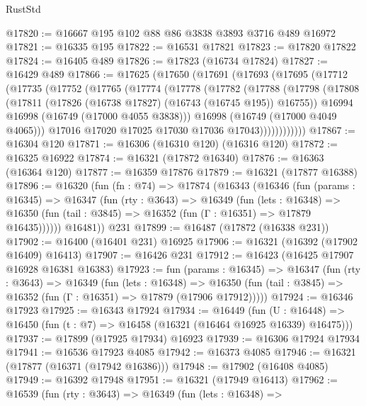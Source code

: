 \begin{lexlean}{RustStd}
\begin{coremodule}
@17820 := @16667 @195 @102 @88 @86 @3838 @3893 @3716 @489 @16972
@17821 := @16335 @195
@17822 := @16531 @17821
@17823 := @17820 @17822
@17824 := @16405 @489
@17826 := @17823 (@16734 @17824)
@17827 := @16429 @489
@17866 := @17625
    (@17650
      (@17691
        (@17693
          (@17695
            (@17712
              (@17735
                (@17752
                  (@17765
                    (@17774
                      (@17778
                        (@17782
                          (@17788
                            (@17798
                              (@17808
                                (@17811 (@17826 (@16738 @17827) (@16743 (@16745 @195)) @16755))
                                @16994
                                @16998
                                (@16749 (@17000 @4055 @3838)))
                              @16998
                              (@16749 (@17000 @4049 @4065)))
                            @17016
                            @17020
                            @17025
                            @17030
                            @17036
                            @17043))))))))))))
@17867 := @16304 @120
@17871 := @16306 (@16310 @120) (@16316 @120)
@17872 := @16325 @16922
@17874 := @16321 (@17872 @16340)
@17876 := @16363 (@16364 @120)
@17877 := @16359 @17876
@17879 := @16321 (@17877 @16388)
@17896 := @16320
    (fun (fn : @74) =>
    @17874
      (@16343
        (@16346
          (fun (params : @16345) =>
          @16347
            (fun (rty : @3643) =>
            @16349
              (fun (lets : @16348) =>
              @16350 (fun (tail : @3845) => @16352 (fun (Γ : @16351) => @17879 @16435))))))
        @16481))
    @231
@17899 := @16487 (@17872 (@16338 @231))
@17902 := @16400 (@16401 @231) @16925
@17906 := @16321 (@16392 (@17902 @16409) @16413)
@17907 := @16426 @231
@17912 := @16423 (@16425 @17907 @16928 @16381 @16383)
@17923 := fun (params : @16345) =>
  @16347
    (fun (rty : @3643) =>
    @16349
      (fun (lets : @16348) =>
      @16350 (fun (tail : @3845) => @16352 (fun (Γ : @16351) => @17879 (@17906 @17912)))))
@17924 := @16346 @17923
@17925 := @16343 @17924
@17934 := @16449
    (fun (U : @16448) => @16450 (fun (t : @7) => @16458 (@16321 (@16464 @16925 @16339) @16475)))
@17937 := @17899 (@17925 @17934) @16923
@17939 := @16306 @17924 @17934
@17941 := @16536 @17923 @4085
@17942 := @16373 @4085
@17946 := @16321 (@17877 (@16371 (@17942 @16386)))
@17948 := @17902 (@16408 @4085)
@17949 := @16392 @17948
@17951 := @16321 (@17949 @16413)
@17962 := @16539
    (fun (rty : @3643) =>
    @16349
      (fun (lets : @16348) =>

\end{coremodule}
\end{lexlean}
